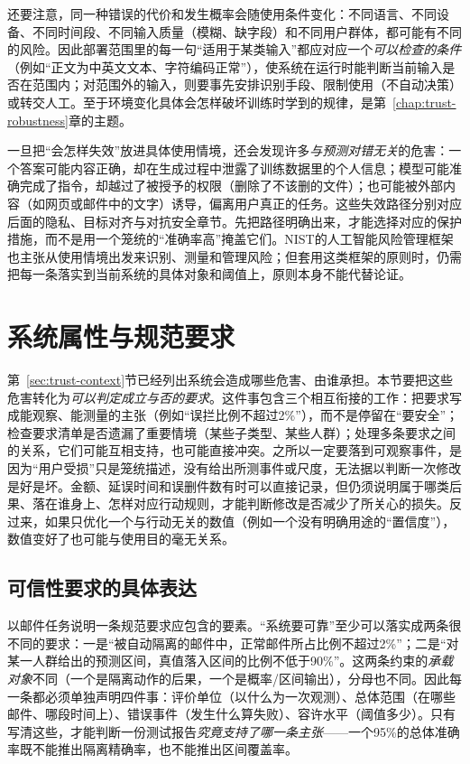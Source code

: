 还要注意，同一种错误的代价和发生概率会随使用条件变化：不同语言、不同设备、不同时间段、不同输入质量（模糊、缺字段）和不同用户群体，都可能有不同的风险。因此部署范围里的每一句“适用于某类输入”都应对应一个\emph{可以检查的条件}（例如“正文为中英文文本、字符编码正常”），使系统在运行时能判断当前输入是否在范围内；对范围外的输入，则要事先安排识别手段、限制使用（不自动决策）或转交人工。至于环境变化具体会怎样破坏训练时学到的规律，是第~\ref{chap:trust-robustness}章的主题。

一旦把“会怎样失效”放进具体使用情境，还会发现许多\emph{与预测对错无关}的危害：一个答案可能内容正确，却在生成过程中泄露了训练数据里的个人信息；模型可能准确完成了指令，却越过了被授予的权限（删除了不该删的文件）；也可能被外部内容（如网页或邮件中的文字）诱导，偏离用户真正的任务。这些失效路径分别对应后面的隐私、目标对齐与对抗安全章节。先把路径明确出来，才能选择对应的保护措施，而不是用一个笼统的“准确率高”掩盖它们。NIST的人工智能风险管理框架也主张从使用情境出发来识别、测量和管理风险；但套用这类框架的原则时，仍需把每一条落实到当前系统的具体对象和阈值上，原则本身不能代替论证。

\section{系统属性与规范要求}
\label{sec:trust-requirements}

第~\ref{sec:trust-context}节已经列出系统会造成哪些危害、由谁承担。本节要把这些危害转化为\emph{可以判定成立与否的要求}。这件事包含三个相互衔接的工作：把要求写成能观察、能测量的主张（例如“误拦比例不超过2\%”），而不是停留在“要安全”；检查要求清单是否遗漏了重要情境（某些子类型、某些人群）；处理多条要求之间的关系，它们可能互相支持，也可能直接冲突。之所以一定要落到可观察事件，是因为“用户受损”只是笼统描述，没有给出所测事件或尺度，无法据以判断一次修改是好是坏。金额、延误时间和误删件数有时可以直接记录，但仍须说明属于哪类后果、落在谁身上、怎样对应行动规则，才能判断修改是否减少了所关心的损失。反过来，如果只优化一个与行动无关的数值（例如一个没有明确用途的“置信度”），数值变好了也可能与使用目的毫无关系。

\subsection{可信性要求的具体表达}

以邮件任务说明一条规范要求应包含的要素。“系统要可靠”至少可以落实成两条很不同的要求：一是“被自动隔离的邮件中，正常邮件所占比例不超过2\%”；二是“对某一人群给出的预测区间，真值落入区间的比例不低于90\%”。这两条约束的\emph{承载对象}不同（一个是隔离动作的后果，一个是概率/区间输出），分母也不同。因此每一条都必须单独声明四件事：评价单位（以什么为一次观测）、总体范围（在哪些邮件、哪段时间上）、错误事件（发生什么算失败）、容许水平（阈值多少）。只有写清这些，才能判断一份测试报告\emph{究竟支持了哪一条主张}——一个95\%的总体准确率既不能推出隔离精确率，也不能推出区间覆盖率。

